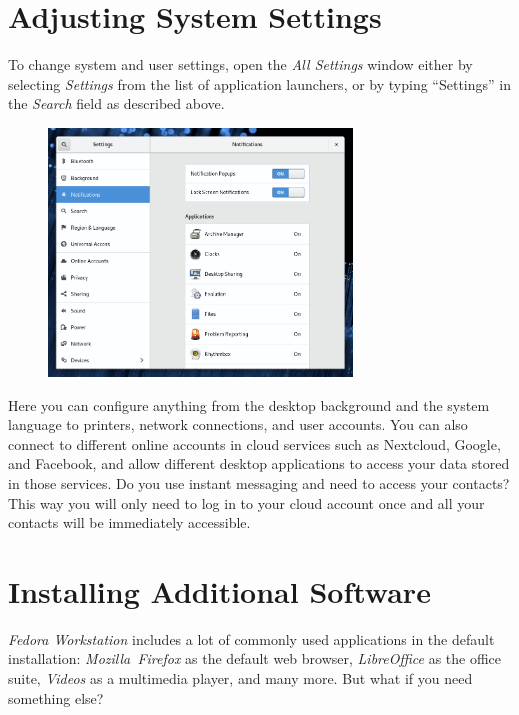 \section*{Adjusting System Settings}

To change system and user settings, open the \emph{All Settings} window either by selecting \emph{Settings} from the list of application launchers, or by typing \enquote{Settings} in the \emph{Search} field as described above.

\begin{figure}[htbp]
\begin{center}
\includegraphics[width=0.72\textwidth]{img/settings}
 \label{fig:settings}
\end{center}
\end{figure}

Here you can configure anything from the desktop background and the system language to printers, network connections, and user accounts. You can also connect to different online accounts in cloud services such as Nextcloud, Google, and Facebook, and allow different desktop applications to access your data stored in those services. Do you use instant messaging and need to access your contacts? This way you will only need to log in to your cloud account once and all your contacts will be immediately accessible.

\section*{Installing Additional Software}

\emph{Fedora Workstation} includes a lot of commonly used applications in the default installation: \emph{Mozilla~Firefox} as the default web browser, \emph{LibreOffice} as the office suite, \emph{Videos} as a multimedia player, and many more. But what if you need something else?

